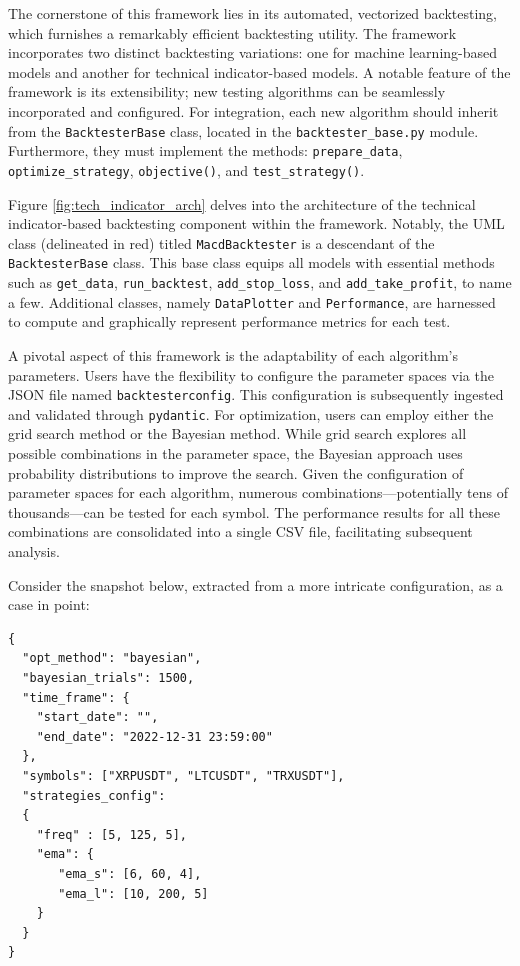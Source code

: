 The cornerstone of this framework lies in its automated, vectorized backtesting, which furnishes a remarkably efficient backtesting utility.
The framework incorporates two distinct backtesting variations: one for machine learning-based models and another for technical indicator-based models.
A notable feature of the framework is its extensibility; new testing algorithms can be seamlessly incorporated and configured.
For integration, each new algorithm should inherit from the \texttt{BacktesterBase} class, located in the \texttt{backtester\_base.py} module.
Furthermore, they must implement the methods: \texttt{prepare\_data}, \texttt{optimize\_strategy}, \texttt{objective()}, and \texttt{test\_strategy()}.

Figure \ref{fig:tech_indicator_arch} delves into the architecture of the technical indicator-based backtesting component within the framework.
Notably, the UML class (delineated in red) titled \texttt{MacdBacktester} is a descendant of the \texttt{BacktesterBase} class.
This base class equips all models with essential methods such as \texttt{get\_data}, \texttt{run\_backtest}, \texttt{add\_stop\_loss}, and \texttt{add\_take\_profit}, to name a few.
Additional classes, namely \texttt{DataPlotter} and \texttt{Performance}, are harnessed to compute and graphically represent performance metrics for each test.

A pivotal aspect of this framework is the adaptability of each algorithm's parameters.
Users have the flexibility to configure the parameter spaces via the JSON file named \texttt{backtesterconfig}.
This configuration is subsequently ingested and validated through \texttt{pydantic}.
For optimization, users can employ either the grid search method or the Bayesian method.
While grid search explores all possible combinations in the parameter space, the Bayesian approach uses probability distributions to improve the search.
Given the configuration of parameter spaces for each algorithm, numerous combinations---potentially tens of thousands---can be tested for each symbol.
The performance results for all these combinations are consolidated into a single CSV file, facilitating subsequent analysis.

Consider the snapshot below, extracted from a more intricate configuration, as a case in point:

\begin{lstlisting}[style=jsonstyle, caption={Machine Learning Pipeline Configuration}]
{
  "opt_method": "bayesian",
  "bayesian_trials": 1500,
  "time_frame": {
    "start_date": "",
    "end_date": "2022-12-31 23:59:00"
  },
  "symbols": ["XRPUSDT", "LTCUSDT", "TRXUSDT"],
  "strategies_config":
  {
    "freq" : [5, 125, 5],
    "ema": {
       "ema_s": [6, 60, 4],
       "ema_l": [10, 200, 5]
    }
  }
}
\end{lstlisting}

